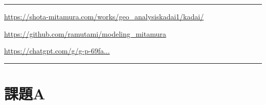 \documentclass[ja=standard,xelatex]{bxjsarticle}
\newcommand{\vs}[1]{\vskip#1\baselineskip}
\begin{document}
\maketitle

\hrule

\begin{description}[
  labelwidth=4.5cm,
  labelsep=0.5cm,
  leftmargin=5.0cm,
  style=multiline
]
  \item[数値計算結果の動画置き場：] \href{https://shota-mitamura.com/works/geo_analysiskadai1/kadai/}{https://shota-mitamura.com/works/geo_analysiskadai1/kadai/}
  \item[コード置き場：] \href{https://github.com/ramutami/modeling_mitamura}{https://github.com/ramutami/modeling\_mitamura}
  \item[AIとのチャットログ：] \href{https://chatgpt.com/g/g-p-69fabe32fd9c81919d69b22d4294ca7e-konhiyutakurahuikusulun-ke-ti/project}{https://chatgpt.com/g/g-p-69fa...}
\end{description}

\hrule
\vs{1}


\tableofcontents


\section{課題A}
\end{document}
